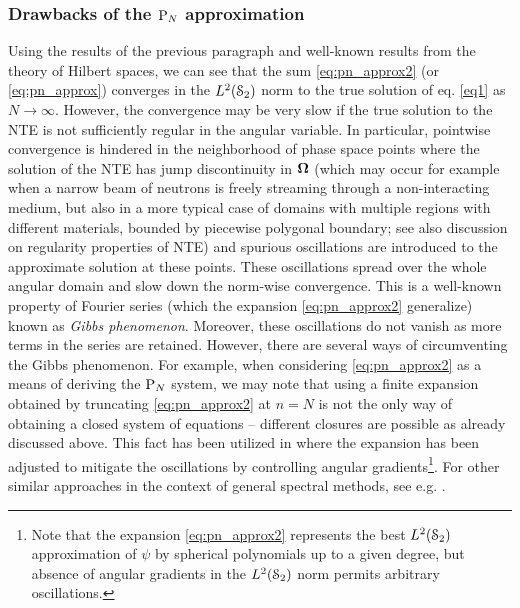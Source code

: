 \subsubsection{Drawbacks of the $\PN$ approximation}
Using the results of the previous paragraph and well-known results from the theory of Hilbert spaces, we can see that
the sum \eqref{eq:pn_approx2} (or \eqref{eq:pn_approx}) converges in the $\Lp[2](\Sphere)$ norm to the true solution of
eq. \eqref{eq1} as $N\to\infty$. However, the convergence may be very slow if the true solution to the NTE is not
sufficiently regular in the angular variable. In particular, pointwise convergence is hindered in the neighborhood of
phase space points where the solution of the NTE has jump discontinuity in $\bomega$ (which may occur for example when a
narrow beam of neutrons is freely streaming through a non-interacting medium, but also in a more typical case of domains
with multiple regions with different materials, bounded by piecewise polygonal boundary; see also \alert{discussion on
regularity properties of NTE}) and spurious oscillations are introduced to the approximate solution at these points.
These oscillations spread over the whole angular domain and slow down the norm-wise convergence. This is a well-known
property of Fourier series (which the expansion \eqref{eq:pn_approx2} generalize) known as \textit{Gibbs phenomenon}.
Moreover, these oscillations do not vanish as more terms in the series are retained. However, there are several ways of
circumventing the Gibbs phenomenon. For example, when considering \eqref{eq:pn_approx2} as a means of deriving the $\PN$
system, we may note that using a finite expansion obtained by truncating \eqref{eq:pn_approx2} at $n=N$ is not the only
way of obtaining a closed system of equations -- different closures are possible as already discussed above. This fact
has been utilized in \cite{McClarren3} where the expansion has been adjusted to mitigate the oscillations by controlling
angular gradients\footnote{Note that the expansion \eqref{eq:pn_approx2} represents the best $\Lp[2](\Sphere)$
approximation of $\psi$ by spherical polynomials up to a given degree, but absence of angular gradients in the
$\Lp[2](\Sphere)$ norm permits arbitrary oscillations.}. For other similar approaches in the context of general spectral
methods, see e.g. \cite{Tanner}.

